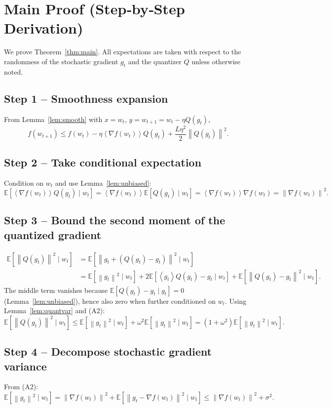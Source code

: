 \documentclass{article}
\newcommand{\E}{\mathbb{E}}
\newcommand{\norm}[1]{\left\lVert#1\right\rVert}
\newcommand{\inner}[1]{\left\langle#1\right\rangle}
\begin{document}
\section*{Main Proof (Step‑by‑Step Derivation)}
We prove Theorem~\ref{thm:main}.  All expectations are taken with respect to the randomness of the stochastic gradient $g_{t}$ and the quantizer $Q$ unless otherwise noted.

\subsection*{Step 1 – Smoothness expansion}
From Lemma~\ref{lem:smooth} with $x=w_{t}$, $y=w_{t+1}=w_{t}-\eta Q(g_{t})$,
\[
f(w_{t+1})\le f(w_{t})-\eta\inner{\nabla f(w_{t})}{Q(g_{t})}
+\frac{L\eta^{2}}{2}\norm{Q(g_{t})}^{2}. \tag{6}
\]

\subsection*{Step 2 – Take conditional expectation}
Condition on $w_{t}$ and use Lemma~\ref{lem:unbiased}:
\[
\E\!\left[\inner{\nabla f(w_{t})}{Q(g_{t})}\mid w_{t}\right]
= \inner{\nabla f(w_{t})}{\E[Q(g_{t})\mid w_{t}]}
= \inner{\nabla f(w_{t})}{\nabla f(w_{t})}
= \norm{\nabla f(w_{t})}^{2}. \tag{7}
\]

\subsection*{Step 3 – Bound the second moment of the quantized gradient}
\[
\begin{aligned}
\E\!\left[\norm{Q(g_{t})}^{2}\mid w_{t}\right]
&= \E\!\left[\norm{g_{t}+ (Q(g_{t})-g_{t})}^{2}\mid w_{t}\right] \\[1mm]
&= \E\!\left[\norm{g_{t}}^{2}\mid w_{t}\right]
   +2\E\!\left[\inner{g_{t}}{Q(g_{t})-g_{t}}\mid w_{t}\right]
   +\E\!\left[\norm{Q(g_{t})-g_{t}}^{2}\mid w_{t}\right].
\end{aligned}
\tag{8}
\]
The middle term vanishes because $\E[Q(g_{t})-g_{t}\mid g_{t}]=0$ (Lemma~\ref{lem:unbiased}), hence also zero when further conditioned on $w_{t}$.  Using Lemma~\ref{lem:quantvar} and (A2):
\[
\E\!\left[\norm{Q(g_{t})}^{2}\mid w_{t}\right]
\le \E\!\left[\norm{g_{t}}^{2}\mid w_{t}\right]
    +\omega^{2}\E\!\left[\norm{g_{t}}^{2}\mid w_{t}\right]
= (1+\omega^{2})\E\!\left[\norm{g_{t}}^{2}\mid w_{t}\right]. \tag{9}
\]

\subsection*{Step 4 – Decompose stochastic gradient variance}
From (A2):
\[
\E\!\left[\norm{g_{t}}^{2}\mid w_{t}\right]
= \norm{\nabla f(w_{t})}^{2}
  +\E\!\left[\norm{g_{t}-\nabla f(w_{t})}^{2}\mid w_{t}\right]
\le \norm{\nabla f(w_{t})}^{2} + \sigma^{2}. \tag{10}
\]
\end{document}
